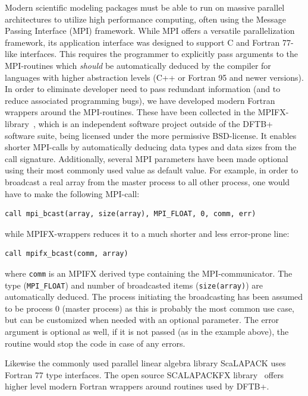 \documentclass[reprint,onecolumn,superscriptaddress]{revtex4-1}
\newcommand{\dftbp}{DFTB+}
\begin{document}
Modern scientific modeling packages must be able to run on massive parallel
architectures to utilize high performance computing, often using the Message
Passing Interface (MPI) framework. While MPI offers a versatile parallelization
framework, its application interface was designed to support C and Fortran
77-like interfaces. This requires the programmer to explicitly pass arguments to the
MPI-routines which {\em should} be automatically deduced by the compiler for
languages with higher abstraction levels (C++ or Fortran 95 and newer versions).
In order to eliminate developer need to pass redundant information (and to
reduce associated programming bugs), we have developed modern Fortran wrappers
around the MPI-routines. These have been collected in the
MPIFX-library~\cite{mpifx}, which is an independent software project outside of the
\dftbp{} software suite, being licensed under the more permissive
BSD-license. It enables shorter MPI-calls by automatically deducing data types
and data sizes from the call signature. Additionally, several MPI parameters
have been made optional using their most commonly used value as default
value. For example, in order to broadcast a real array from the master process
to all other process, one would have to make the following MPI-call:
\begin{verbatim}
call mpi_bcast(array, size(array), MPI_FLOAT, 0, comm, err)
\end{verbatim}
while MPIFX-wrappers reduces it to a much shorter and less error-prone line:
\begin{verbatim}
call mpifx_bcast(comm, array)
\end{verbatim}
where \verb|comm| is an MPIFX derived type containing the MPI-communicator. The
type (\verb|MPI_FLOAT|) and number of broadcasted items (\verb|size(array)|) are
automatically deduced. The process initiating the broadcasting has been assumed
to be process 0 (master process) as this is probably the most common use case,
but can be customized when needed with an optional parameter. The error
argument is optional as well, if it is not passed (as in the example above),
the routine would stop the code in case of any errors.

Likewise the commonly used parallel linear algebra library ScaLAPACK uses
Fortran 77 type interfaces. The open source SCALAPACKFX
library~\cite{scalapackfx} offers higher level modern Fortran wrappers around
routines used by \dftbp{}.
\end{document}
